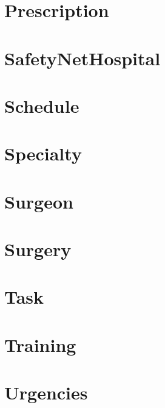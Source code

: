\documentclass{article}
\begin{document}
\section{Prescription}

\section{SafetyNetHospital}

\section{Schedule}

\section{Specialty}

\section{Surgeon}

\section{Surgery}

\section{Task}

\section{Training}

\section{Urgencies}

\end{document}
